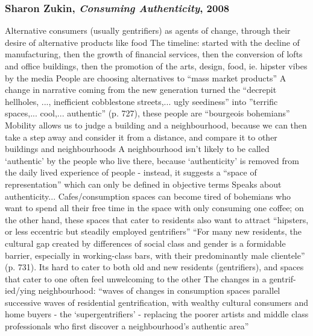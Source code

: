 \documentclass{article}
\begin{document}
\begin{outline}
	\1
\end{outline}

\subsubsection{Sharon Zukin, \textit{Consuming Authenticity}, 2008}

\begin{outline}
	\1 Alternative consumers (usually gentrifiers) as agents of change, through their desire of alternative products like food
	\1 The timeline: started with the decline of manufacturing, then the growth of financial services, then the conversion of lofts and office buildings, then the promotion of the arts, design, food, ie. hipster vibes by the media 
	\1 People are choosing alternatives to ``mass market products''
	\1 A change in narrative coming from the new generation turned the ``decrepit hellholes, ..., inefficient cobblestone streets,... ugly seediness'' into ''terrific spaces,... cool,... authentic'' (p. 727), these people are ``bourgeois bohemians''
	\1 Mobility allows us to judge a building and a neighbourhood, because we can then take a step away and consider it from a distance, and compare it to other buildings and neighbourhoods
		\2 A neighbourhood isn't likely to be called `authentic' by the people who live there, because `authenticity' is removed from the daily lived experience of people - instead, it suggests a ``space of representation'' which can only be defined in objective terms
		\2 Speaks about authenticity...
	\1 Cafes/consumption spaces can become tired of bohemians who want to spend all their free time in the space with only consuming one coffee; on the other hand, these spaces that cater to residents also want to attract ``hipsters, or less eccentric but steadily employed gentrifiers''
	\1 ``For many new residents, the cultural gap created by differences of social class and gender is a formidable barrier, especially in working-class bars, with their predominantly male clientele'' (p. 731). Its hard to cater to both old and new residents (gentrifiers), and spaces that cater to one often feel unwelcoming to the other
	\1 The changes in a gentrif-ied/ying neighbourhood: ``waves of changes in consumption spaces parallel successive waves of residential gentrification, with wealthy cultural consumers and home buyers - the `supergentrifiers' - replacing the poorer artists and middle class professionals who first discover a neighbourhood's authentic area''
\end{outline}
\end{document}
